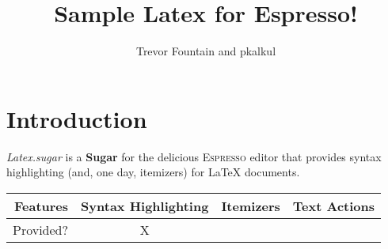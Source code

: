 \documentclass[10pt,twocolumn]{article}
\title{Sample Latex for Espresso!}
\author{Trevor Fountain and pkalkul}
\begin{document}
\maketitle

\section{Introduction}


\emph{Latex.sugar} is a \textbf{Sugar} for the delicious \textsc{Espresso} editor that provides syntax highlighting (and, one day, itemizers) for LaTeX documents.

\begin{table}[h!]
\begin{tabular}{r|c c c}
\textbf{Features} & Syntax Highlighting & Itemizers & Text Actions \\ \hline
Provided? & X & &
\end{tabular}
\end{table}
\end{document}

